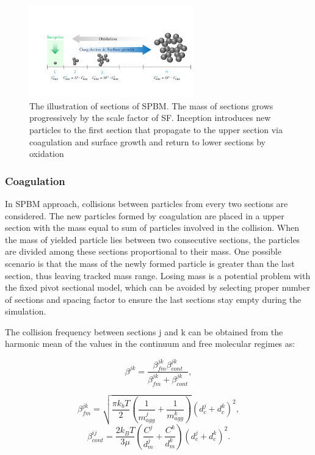 \begin{figure}[!htbp]
	\centering
	\includegraphics[height=40mm, ]{Figures/Theory/Sectional.pdf}
	\caption{The illustration of sections of SPBM. The mass of sections grows progressively by the scale factor of SF. Inception introduces new particles to the first section that propagate to the upper section via coagulation and surface growth and return to lower sections by oxidation}
	\label{fig:sectional}
\end{figure}

\subsubsection{Coagulation}
\label{sec:sectcoag}
In SPBM approach, collisions between particles from every two sections are considered. The new particles formed by coagulation are placed in a upper section with the mass equal to sum of particles involved in the collision. When the mass of yielded particle lies between two consecutive sections, the particles are divided among these sections proportional to their mass. One possible scenario is that the mass of the newly formed particle is greater than the last section, thus leaving tracked mass range. Losing mass is a potential problem with the fixed pivot sectional model, which can be avoided by selecting proper number of sections and spacing factor to ensure the last sections stay empty during the simulation.

The collision frequency between sections j and k can be obtained from the harmonic mean of the values in the continuum and free molecular regimes as:

\begin{equation}
	\beta^{jk} = 				       \frac{\beta^{jk}_{fm}\beta^{jk}_{cont}}{\beta^{jk}_{fm}
		+\beta^{jk}_{cont}}
	\label{eqn:betahmsect},
\end{equation}

\begin{equation}
	\beta^{jk}_{fm} =
	\sqrt{
		\frac{\pi k_b T}{2}
		\left(
			\frac{1}{m^j_{agg}}+
			\frac{1}{m^k_{agg}}
		\right)
	} 
	\left(
		d^j_c+d^k_c
	\right)^2
	\label{eqn:betafmsect},
\end{equation}
\begin{equation}
	\beta^{ij}_{cont} = \frac{2k_BT}{3\mu}
	\left(
		\frac{C^j}{d^j_m}+
		\frac{C^k}{d^k_m}
	\right)
	\left(
		d^j_c+d^k_c
	\right)^2
	\label{eqn:betacontsect}.
\end{equation}

